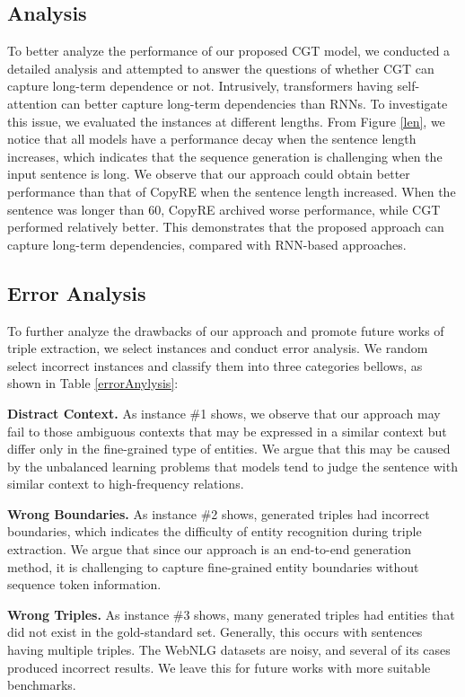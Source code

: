 \documentclass[letterpaper]{article} \usepackage{aaai21}  \usepackage{times}  \usepackage{helvet} \usepackage{courier}  \usepackage[hyphens]{url}  \usepackage{graphicx} \urlstyle{rm} \def\UrlFont{\rm}  \usepackage{natbib}  \usepackage[noend]{algpseudocode}
\begin{document}
\subsection{Analysis}
To better analyze the performance of our proposed CGT model, we conducted a detailed analysis and attempted to answer the questions of whether CGT can capture long-term dependence or not.
Intrusively, transformers having self-attention can better capture long-term dependencies than RNNs. To investigate this issue, we evaluated the instances at different lengths. From Figure \ref{len}, we notice that all models have a performance decay when the sentence length increases, which indicates that the sequence generation is challenging when the input sentence is long. We observe that our approach could obtain better performance than that of CopyRE when the sentence length increased. When the sentence was longer than 60, CopyRE archived worse performance, while CGT performed relatively better. This demonstrates that the proposed approach can capture long-term dependencies, compared with RNN-based approaches.
 
\subsection{Error Analysis}
To further analyze the drawbacks of our approach and promote future works of triple extraction, we select instances and conduct error analysis. We random select incorrect instances and classify them into three categories bellows, 
as shown in Table \ref{errorAnylysis}:

\textbf{Distract Context.} As instance \#1 shows, we observe that our approach may fail to those ambiguous contexts that may be expressed in a similar context but differ only in the fine-grained type of entities. We argue that this may be caused by the unbalanced learning problems that models tend to judge the sentence with similar context to high-frequency relations. 

 \textbf{Wrong Boundaries.} As instance \#2 shows, generated triples had incorrect boundaries, which indicates the difficulty of entity recognition during triple extraction. We argue that since our approach is an end-to-end generation method, it is challenging to capture fine-grained entity boundaries without sequence token information. 

 \textbf{Wrong Triples.} As instance \#3 shows, many generated triples had entities that did not exist in the gold-standard set. Generally, this occurs with sentences having multiple triples. The WebNLG datasets are noisy, and several of its cases produced incorrect results. We leave this for future works with more suitable benchmarks.  
 
\end{document}
